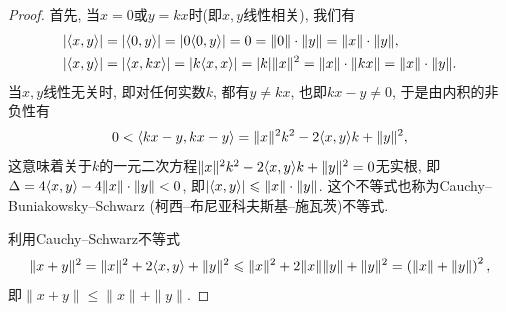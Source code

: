 \begin{3b}
\begin{enumerate}
\begin{proof}
首先, 当\(x=0\)或\(y=kx\)时(即\(x,y\)线性相关), 我们有\[\begin{split}
|\langle x,y \rangle|&=|\langle 0,y \rangle|=|0\langle 0,y \rangle|=0=\|0\|\cdot\|y\|=\|x\|\cdot\|y\|,\\
|\langle x,y \rangle|&=|\langle x,kx \rangle|=|k\langle x,x \rangle|=|k|\|x\|^2=\|x\|\cdot\|kx\|=\|x\|\cdot\|y\|.
\end{split}\]当\(x,y\)线性无关时, 即对任何实数\(k\), 都有\(y\ne kx\), 也即\(kx-y\ne 0\), 于是由内积的非负性有
\[0<\langle kx-y,kx-y \rangle=\|x\|^2k^2-2\langle x,y \rangle k+\|y\|^2,\]
这意味着关于\(k\)的一元二次方程\(\|x\|^2k^2-2\langle x,y \rangle k+\|y\|^2=0\)无实根, 
即\(\Delta=4\langle x,y \rangle-4\|x\|\cdot\|y\|<0\), 
即\(|\langle x,y \rangle|\leqslant\|x\|\cdot\|y\|\). 
这个不等式也称为Cauchy--Buniakowsky--Schwarz (柯西--布尼亚科夫斯基--施瓦茨)不等式.

利用Cauchy--Schwarz不等式\[\|x+y\|^2=\|x\|^2+2\langle x,y \rangle+\|y\|^2
\leqslant\|x\|^2+2\|x\|\|y\|+\|y\|^2=\left(\|x\|+\|y\|\right)^2,\]
即\(\|x+y\|\leqslant\|x\|+\|y\|\).


\end{proof}
\end{enumerate}
\end{3b}

